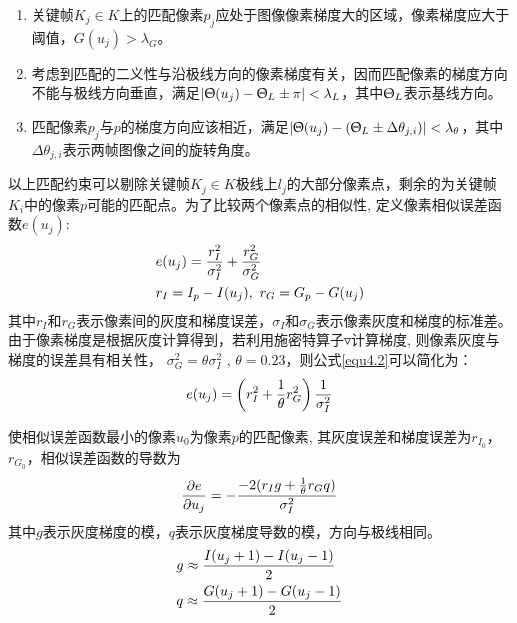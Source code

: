 \begin{enumerate}[label={(\arabic*)}]

\item 关键帧$K_j \in K$上的匹配像素$p_j$应处于图像像素梯度大的区域，像素梯度应大于阈值，$G(u_j)> \lambda_G$。

\item 考虑到匹配的二义性与沿极线方向的像素梯度有关，因而匹配像素的梯度方向不能与极线方向垂直，满足$\vert \Uptheta(u_j)-\Uptheta_L \pm \pi \vert < \lambda_L$，其中$\Uptheta_L$表示基线方向。

\item 匹配像素$p_j$与$p$的梯度方向应该相近，满足$\vert \Uptheta(u_j)-(\Uptheta_L \pm \Delta \theta_{j,i}) \vert < \lambda_\theta $，其中$\Delta \theta_{j,i}$表示两帧图像之间的旋转角度。

\end{enumerate}
以上匹配约束可以剔除关键帧$K_j \in K$极线上$l_j$的大部分像素点，剩余的为关键帧$K_i$中的像素$p$可能的匹配点。为了比较两个像素点的相似性, 定义像素相似误差函数$e(u_j)$:
\begin{equation}
\label{equ4.2}
\begin{aligned}
& e(u_j) = {r_I^2 \over \sigma_I^2} + {r_G^2 \over \sigma_G^2} \\ 
& r_I = I_p-I(u_j),\  r_G = G_p-G(u_j)
\end{aligned}
\end{equation}
其中$r_I$和$r_G$表示像素间的灰度和梯度误差，$\sigma_I$和$\sigma_G$表示像素灰度和梯度的标准差。由于像素梯度是根据灰度计算得到，若利用施密特算子$\triangledown$计算梯度, 则像素灰度与梯度的误差具有相关性，
$\sigma_G^2=\theta \sigma_I^2$ , $ \theta = 0.23$，则公式\eqref{equ4.2}可以简化为：
\begin{equation}
\label{equ4.3}
 e(u_j) = \left( {r_I^2}+{1 \over \theta} r_G^2 \right) {1 \over \sigma_I^2}
\end{equation} 

使相似误差函数最小的像素$u_0$为像素$p$的匹配像素, 其灰度误差和梯度误差为$r_{I_0}$，$r_{G_0}$，相似误差函数的导数为
\begin{equation}
\label{equ4.4}
{\partial e \over \partial u_j } = -{ -2(r_I g+ { 1 \over \theta} r_G q )  \over \sigma_I^2 }
\end{equation}
其中$g$表示灰度梯度的模，$q$表示灰度梯度导数的模，方向与极线相同。
\begin{equation}
\label{equ4.5}
\begin{aligned}
& g \approx { {I(u_j+1) - I(u_j-1)} \over 2 } \\
& q \approx { {G(u_j+1) - G(u_j-1)} \over 2 } 
\end{aligned}
\end{equation}

